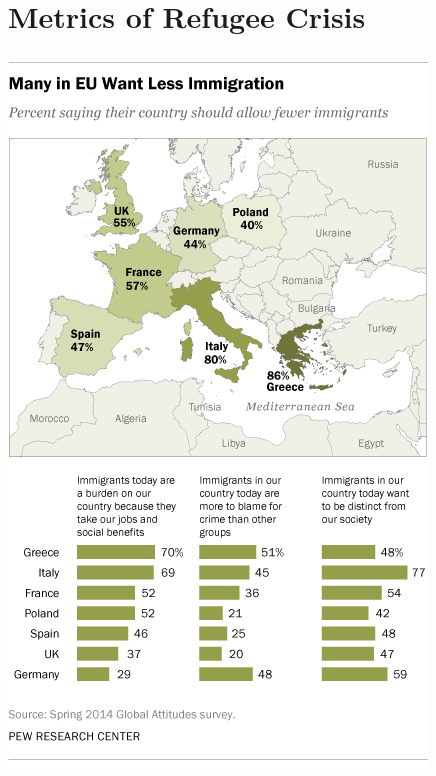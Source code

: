 \documentclass{article}
\begin{document}
\section{Metrics of Refugee Crisis}

\begin{center}
\includegraphics[scale=0.5]{ImmigrationPoll}
\end{center}
\end{document}
